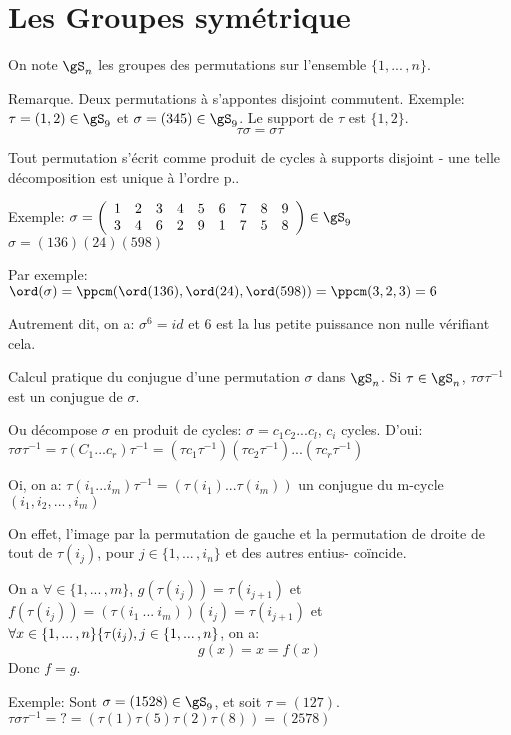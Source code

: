 \section{Les Groupes symétrique} %

On note $\gS_n$ les groupes des permutations sur l'ensemble $\{1, ...\,, n\}$.

Remarque. Deux permutations à s'appontes disjoint commutent.
Exemple: $\tau=(1, 2)\in \gS_9$ et $\sigma=(345) \in \gS_9$.
Le support de $\tau$ est $\{1,2\}$. 
$$\tau\sigma =\sigma \tau$$

\begin{theorem}
	Tout permutation s'écrit comme produit de cycles à supports disjoint - une telle décomposition est unique à l'ordre p..
\end{theorem}

Exemple: $\sigma = \left(\begin{array}{ccccccccc}1&2&3&4&5&6&7&8&9\\3&4&6&2&9&1&7&5&8\end{array}\right)\in\gS_9$
$\sigma=(136)(24)(598)$

Par exemple: $\ord(\sigma)=\ppcm(\ord(136), \ord(24), \ord(598))=\ppcm(3,2,3)=6$

Autrement dit, on a: $\sigma^6=id$ et 6 est la lus petite puissance non nulle vérifiant cela.

Calcul pratique du conjugue d'une permutation $\sigma$ dans $\gS_n$. Si $\tau\in\gS_n$, $\tau\sigma\tau^{-1}$ est un conjugue de $\sigma$.

Ou décompose $\sigma$ en produit de cycles: $\sigma=c_1 c_2...c_l$, $c_i$ cycles.
D'oui: $\tau\sigma\tau^{-1} =\tau(C_1...c_r)\tau^{-1}=(\tau c_1\tau^{-1})(\tau c_2\tau^{-1})...(\tau c_r\tau^{-1})$

Oi, on a: $\tau(i_1...i_m)\tau^{-1}=(\tau(i_1)...\tau(i_m))$ un conjugue du m-cycle $(i_1, i_2, ...\,, i_m)$

On effet, l'image par la permutation de gauche et la permutation de droite de tout de $\tau(i_j)$, pour $j\in\{1,...\,,i_n\}$ et des autres entius- coïncide.

On a $\forall\in\{1,...\,,m\}$, $g(\tau(i_j))=\tau(i_{j+1})$ et $f(\tau(i_j))=(\tau(i_1\ ...\ i_m))(i_j)=\tau(i_{j+1})$
et $\forall x\in \{ 1,...\,,n\}\\ \{\tau(i_j), j\in\{1,...\,,n\}$, on a:
$$g(x)=x=f(x)$$
Donc $f=g$.

Exemple:
Sont $\sigma=(1528)\in\gS_9$, et soit $\tau=(127)$.
$\tau\sigma\tau^{-1}=?= (\tau(1)\tau(5)\tau(2)\tau(8))=(2578)$

